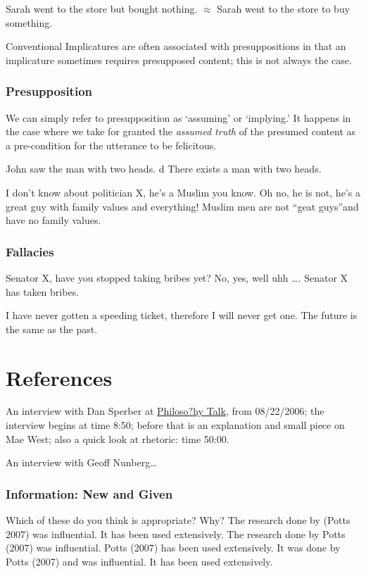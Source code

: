 \documentclass{article}
\begin{document}
\pex \a Sarah went to the store but bought nothing.
\a $\approx$ Sarah went to the store to buy something.
\xe

Conventional Implicatures are often associated with presuppositions in that an implicature sometimes requires presupposed content; this is not always the case.

\subsubsection{Presupposition}
We can simply refer to presupposition as `assuming' or `implying.' It happens in the case where we take for granted the {\sl assumed truth} of the presumed content as a pre-condition for the utterance to be felicitous.

\pex \a John saw the man with two heads.
d There exists a man with two heads.
\xe

\pex \a I don't know about politician X, he's a Muslim you know.
\a Oh no, he is not, he's a great guy with family values and everything!
 Muslim men are not ``geat guys''and have no family values.
\xe

\subsubsection{Fallacies}
\pex \a Senator X, have you stopped taking bribes yet?
\a No, yes, well uhh \ldots.
 Senator X has taken bribes.
\xe

\pex \a I have never gotten a speeding ticket, therefore I will never get one.
 The future is the same as the past.
\xe

\section{References}
An interview with Dan Sperber at \href{http://www.philosophytalk.org/pastShows/LanguageInAction.html}{Philoso?hy Talk}, from 08/22/2006; the interview begins at time 8:50; before that is an explanation and small piece on Mae West; also a quick look at rhetoric: time 50:00.

An interview with Geoff Nunberg\ldots

\subsubsection{Information: New and Given}
Which of these do you think is appropriate? Why?
\pex \a The research done by (Potts 2007) was influential. It has been used extensively.
\a The research done by Potts (2007) was influential. Potts (2007) has been used extensively.
\a It was done by Potts (2007) and was influential. It has been used extensively.
\end{document}
